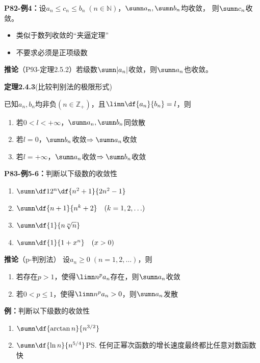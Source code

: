 {\bf P82-例4：}设$a_n\leq c_n\leq b_n\;(n\in\mathbb{N})$，$\sumn a_n,\sumn b_n$均收敛，
则$\sumn c_n$收敛。
\begin{itemize}
  \setlength{\itemindent}{1cm}
  \item 类似于数列收敛的“夹逼定理”
  \item 不要求必须是正项级数
\end{itemize}

{\bf 推论}（P93-定理2.5.2）若级数$\sumn|a_n|$收敛，则$\sumn a_n$也收敛。

{\bf 定理2.4.3}(比较判别法的极限形式)

已知$a_n,b_n$均非负$(n\in\mathbb{Z}_+)$，且$\limn\df{a_n}{b_n}=l$，则 
\begin{enumerate}
  \setlength{\itemindent}{1cm}
  \item 若$0<l<+\infty$，$\sumn a_n,\sumn b_n$同敛散 
  \item 若$l=0$，$\sumn b_n$收敛$\Rightarrow\sumn a_n$收敛 
  \item 若$l=+\infty$，$\sumn a_n$收敛$\Rightarrow\sumn b_n$收敛
\end{enumerate}

{\bf P83-例5-6：}判断以下级数的收敛性
\begin{enumerate}[(1)]
  \setlength{\itemindent}{1cm}
  \item $\sumn\df 1{2^n}\df{n^2+1}{2n^2-1}$ 
  \item $\sumn\df{n+1}{n^k+2}\quad (k=1,2,\ldots)$ 
  \item $\sumn\df{1}{n\sqrt[n]{n}}$ 
  \item $\sumn\df{1}{1+x^n}\quad(x>0)$
\end{enumerate}

{\bf 推论}（p-判别法）
设$a_n\geq 0\;(n=1,2,\ldots)$，则 
\begin{enumerate}
  \setlength{\itemindent}{1cm}
  \item 若存在$p>1$，使得$\limn n^pa_n$存在，则$\sumn a_n$收敛 
  \item 若$0<p\leq 1$，使得$\limn n^pa_n>0$，则$\sumn a_n$发散
\end{enumerate}

{\bf 例：}判断以下级数的收敛性
\begin{enumerate}[(1)]
  \setlength{\itemindent}{1cm}
  \item $\sumn\df{\arctan n}{n^{3/2}}$
  \item $\sumn\df{\ln n}{n^{5/4}}$\ps{任何正幂次函数的增长速度最终都比任意对数函数快}
\end{enumerate}

